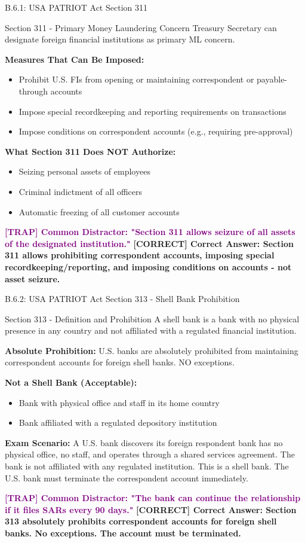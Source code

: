 \documentclass[11pt,a4paper]{beamer}
\newcommand{\trap}[1]{\textcolor{purple}{\textbf{[TRAP] #1}}}
\newcommand{\correct}[1]{\textcolor{green!50!black}{\textbf{[CORRECT] #1}}}
\begin{document}
	\begin{frame}{B.6.1: USA PATRIOT Act Section 311}
		\begin{block}{Section 311 - Primary Money Laundering Concern}
			Treasury Secretary can designate foreign financial institutions as primary ML concern.
		\end{block}
		\textbf{Measures That Can Be Imposed:}
		\begin{itemize}
			\item Prohibit U.S. FIs from opening or maintaining correspondent or payable-through accounts
			\item Impose special recordkeeping and reporting requirements on transactions
			\item Impose conditions on correspondent accounts (e.g., requiring pre-approval)
		\end{itemize}
		\textbf{What Section 311 Does NOT Authorize:}
		\begin{itemize}
			\item Seizing personal assets of employees
			\item Criminal indictment of all officers
			\item Automatic freezing of all customer accounts
		\end{itemize}
		\trap{Common Distractor: "Section 311 allows seizure of all assets of the designated institution."}
		\correct{Correct Answer: Section 311 allows prohibiting correspondent accounts, imposing special recordkeeping/reporting, and imposing conditions on accounts - not asset seizure.}
	\end{frame}
	
	\begin{frame}{B.6.2: USA PATRIOT Act Section 313 - Shell Bank Prohibition}
		\begin{block}{Section 313 - Definition and Prohibition}
			A shell bank is a bank with no physical presence in any country and not affiliated with a regulated financial institution.
		\end{block}
		\textbf{Absolute Prohibition:}
		U.S. banks are absolutely prohibited from maintaining correspondent accounts for foreign shell banks. NO exceptions.
		
		\textbf{Not a Shell Bank (Acceptable):}
		\begin{itemize}
			\item Bank with physical office and staff in its home country
			\item Bank affiliated with a regulated depository institution
		\end{itemize}
		\textbf{Exam Scenario:}
		A U.S. bank discovers its foreign respondent bank has no physical office, no staff, and operates through a shared services agreement. The bank is not affiliated with any regulated institution. This is a shell bank. The U.S. bank must terminate the correspondent account immediately.
		
		\trap{Common Distractor: "The bank can continue the relationship if it files SARs every 90 days."}
		\correct{Correct Answer: Section 313 absolutely prohibits correspondent accounts for foreign shell banks. No exceptions. The account must be terminated.}
	\end{frame}
	
\end{document}
